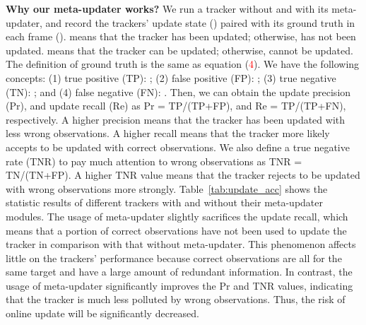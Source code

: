 \documentclass[10pt,twocolumn,letterpaper]{article}
\begin{document}
\noindent \textbf{Why our meta-updater works?}
We run a tracker without and with its meta-updater, and record the trackers' update state
() paired with its ground truth in each frame ().
 means that the tracker has been updated; otherwise, has not been updated.
 means that the tracker can be updated; otherwise, cannot be updated.
The definition of ground truth  is the same as equation (\textcolor{red}{4}).
We have the following concepts: (1) true positive (TP): ;
(2) false positive (FP): ; (3) true negative (TN): ; and
(4) false negative (FN): .
Then, we can obtain the update precision (Pr), and update recall (Re) as Pr = TP/(TP+FP),
and Re = TP/(TP+FN), respectively.
A higher precision means that the tracker has been updated with less wrong observations.
A higher recall means that the tracker more likely accepts to be updated with correct observations.
We also define a  true negative rate (TNR) to pay much attention to wrong observations
as TNR = TN/(TN+FP).
A higher TNR value means that the tracker rejects to be updated with wrong observations
more strongly.
Table~\ref{tab:update_acc} shows the statistic results of different trackers with and without
their meta-updater modules.
The usage of meta-updater slightly sacrifices the update recall, which means that a portion of
correct observations have not been used to update the tracker in comparison with that without
meta-updater.
This phenomenon affects little on the trackers' performance because correct observations are all for
the same target and have a large amount of redundant information.
In contrast, the usage of meta-updater significantly improves the Pr and TNR values, indicating that
the tracker is much less polluted by wrong observations.
Thus, the risk of online update will be significantly decreased.
\end{document}
